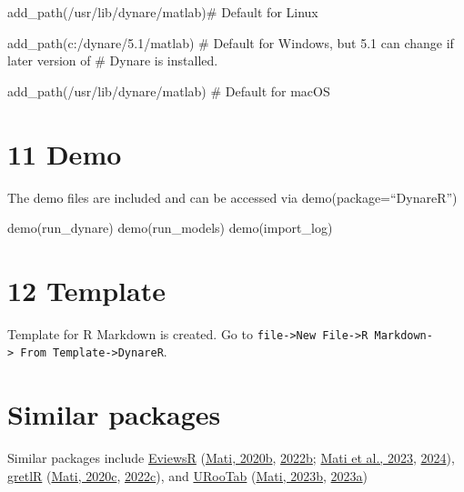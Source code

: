 \documentclass[
  12pt,
  legalpaperpaper,
  DIV=11,
  numbers=noendperiod]{scrartcl}
\newenvironment{Shaded}{\begin{snugshade}}{\end{snugshade}}
\newcommand{\CommentTok}[1]{\textcolor[rgb]{0.37,0.37,0.37}{#1}}
\newcommand{\FunctionTok}[1]{\textcolor[rgb]{0.28,0.35,0.67}{#1}}
\newcommand{\NormalTok}[1]{\textcolor[rgb]{0.00,0.23,0.31}{#1}}
\newcommand{\StringTok}[1]{\textcolor[rgb]{0.13,0.47,0.30}{#1}}
\begin{document}
\begin{Shaded}
\begin{Highlighting}[]
\FunctionTok{add\_path}\NormalTok{(}\StringTok{\textquotesingle{}/usr/lib/dynare/matlab\textquotesingle{}}\NormalTok{)}\CommentTok{\#  Default for Linux}

\FunctionTok{add\_path}\NormalTok{(}\StringTok{\textquotesingle{}c:/dynare/5.1/matlab\textquotesingle{}}\NormalTok{) }\CommentTok{\# Default for Windows, but 5.1 can change if later version of}
\CommentTok{\# \textasciigrave{}Dynare\textasciigrave{} is installed.}

\FunctionTok{add\_path}\NormalTok{(}\StringTok{\textquotesingle{}/usr/lib/dynare/matlab\textquotesingle{}}\NormalTok{) }\CommentTok{\# Default for macOS}
\end{Highlighting}
\end{Shaded}

\hypertarget{demo}{%
\section{11 Demo}\label{demo}}

The demo files are included and can be accessed via
demo(package=``DynareR'')

\begin{Shaded}
\begin{Highlighting}[]
\FunctionTok{demo}\NormalTok{(run\_dynare)}
\FunctionTok{demo}\NormalTok{(run\_models)}
\FunctionTok{demo}\NormalTok{(import\_log)}
\end{Highlighting}
\end{Shaded}

\hypertarget{template}{%
\section{12 Template}\label{template}}

Template for R Markdown is created. Go to
\texttt{file-\textgreater{}New\ File-\textgreater{}R\ Markdown-\textgreater{}\ From\ Template-\textgreater{}DynareR}.

\hypertarget{similar-packages}{%
\section{Similar packages}\label{similar-packages}}

Similar packages include
\href{https://github.com/sagirumati/EviewsR}{EviewsR}
(\protect\hyperlink{ref-Mati2020a}{Mati, 2020b},
\protect\hyperlink{ref-mati2022eviewsr}{2022b};
\protect\hyperlink{ref-Mati2023}{Mati et al., 2023},
\protect\hyperlink{ref-Mati2024}{2024}),
\href{https://github.com/sagirumati/gretlR}{gretlR}
(\protect\hyperlink{ref-Mati2020b}{Mati, 2020c},
\protect\hyperlink{ref-mati2022gretlr}{2022c}), and
\href{https://github.com/sagirumati/URooTab}{URooTab}
(\protect\hyperlink{ref-Mati2023a}{Mati, 2023b},
\protect\hyperlink{ref-mati2023urootab}{2023a})
\end{document}
